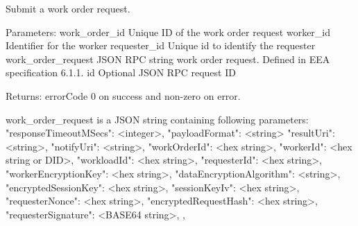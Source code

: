 \begin{DoxyVerb}Submit a work order request.

Parameters:
work_order_id      Unique ID of the work order request
worker_id          Identifier for the worker
requester_id       Unique id to identify the requester
work_order_request JSON RPC string work order request.
           Defined in EEA specification 6.1.1.
id                 Optional JSON RPC request ID

Returns:
errorCode          0 on success and non-zero on error.

work_order_request is a JSON string containing following parameters:
{
    "responseTimeoutMSecs": <integer>,
    "payloadFormat": <string>
    "resultUri": <string>,
    "notifyUri": <string>,
    "workOrderId": <hex string>,
    "workerId": <hex string or DID>,
    "workloadId": <hex string>,
    "requesterId": <hex string>,
    "workerEncryptionKey": <hex string>,
    "dataEncryptionAlgorithm": <string>,
    "encryptedSessionKey": <hex string>,
    "sessionKeyIv": <hex string>,
    "requesterNonce": <hex string>,
    "encryptedRequestHash": <hex string>,
    "requesterSignature": <BASE64 string>,
},


\end{DoxyVerb}
